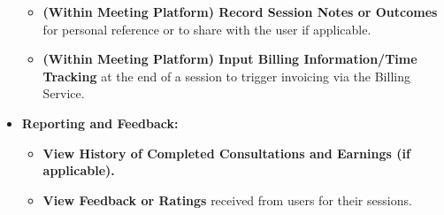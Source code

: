 \documentclass[12pt, a4paper]{report} %
\begin{document}
\begin{itemize}
\begin{itemize}
            \item \textbf{(Within Meeting Platform) Record Session Notes or Outcomes} for personal reference or to share with the user if applicable.
            \item \textbf{(Within Meeting Platform) Input Billing Information/Time Tracking} at the end of a session to trigger invoicing via the Billing Service.
        \end{itemize}
    \item \textbf{Reporting and Feedback:}
        \begin{itemize}
            \item \textbf{View History of Completed Consultations and Earnings (if applicable).}
            \item \textbf{View Feedback or Ratings} received from users for their sessions.
        \end{itemize}
  \end{itemize}
\end{document}
